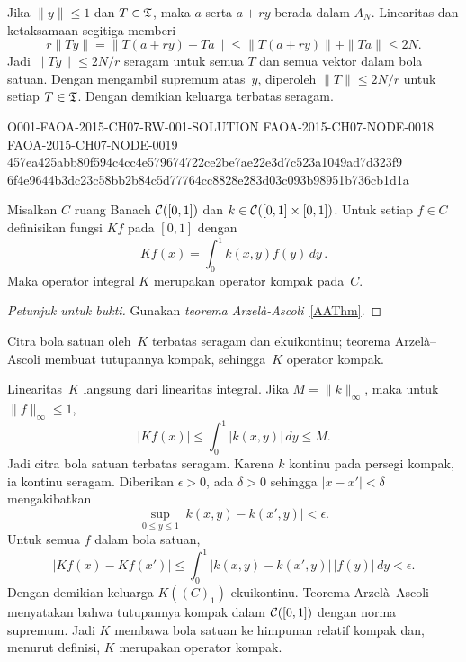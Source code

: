 \begin{o001readerwork}
\begin{o001proof}
Jika $\|y\|\leq1$ dan $T\in\mathfrak{T}$, maka $a$ serta $a+ry$ berada dalam
$A_N$. Linearitas dan ketaksamaan segitiga memberi
\[
 r\|Ty\|=\|T(a+ry)-Ta\|
 \leq\|T(a+ry)\|+\|Ta\|\leq2N.
\]
Jadi $\|Ty\|\leq2N/r$ seragam untuk semua $T$ dan semua vektor dalam bola
satuan. Dengan mengambil supremum atas~$y$, diperoleh
$\|T\|\leq2N/r$ untuk setiap $T\in\mathfrak{T}$. Dengan demikian keluarga
terbatas seragam.
\end{o001proof}
\end{o001readerwork}

\begin{o001readerwork}
  {O001-FAOA-2015-CH07-RW-001-SOLUTION}
  {FAOA-2015-CH07-NODE-0018}
  {FAOA-2015-CH07-NODE-0019}
  {457ea425abb80f594c4cc4e579674722ce2be7ae22e3d7c523a1049ad7d323f9}
  {6f4e9644b3dc23c58bb2b84c5d77764cc8828e283d03c093b98951b736cb1d1a}
\begin{o001result}
\begin{exam} Misalkan $C$ ruang Banach $\mathcal{C}([0,1])$ dan $k \in \mathcal{C}([0,1] \times [0,1])$.  Untuk setiap $f \in C$
definisikan fungsi $Kf$ pada $[0,1]$ dengan
   \[ Kf(x) = \int_0^1 k(x,y)f(y)\,dy\,. \]
Maka operator integral $K$ merupakan operator kompak pada~$C$.
\end{exam}
\end{o001result}
\begin{o001sourcehint}
\begin{proof}[\emph{Petunjuk untuk bukti}] Gunakan \emph{teorema Arzel\`a-Ascoli}~\ref{AAThm}.  \ns
\end{proof}
\end{o001sourcehint}
\begin{o001answer}
Citra bola satuan oleh~$K$ terbatas seragam dan ekuikontinu; teorema
Arzelà--Ascoli membuat tutupannya kompak, sehingga~$K$ operator kompak.
\end{o001answer}
\begin{o001proof}
Linearitas~$K$ langsung dari linearitas integral. Jika
$M=\|k\|_\infty$, maka untuk $\|f\|_\infty\leq1$,
\[
 |Kf(x)|\leq\int_0^1|k(x,y)|\,dy\leq M.
\]
Jadi citra bola satuan terbatas seragam. Karena $k$ kontinu pada persegi
kompak, ia kontinu seragam. Diberikan $\epsilon>0$, ada $\delta>0$ sehingga
$|x-x'|<\delta$ mengakibatkan
\[
 \sup_{0\leq y\leq1}|k(x,y)-k(x',y)|<\epsilon.
\]
Untuk semua $f$ dalam bola satuan,
\[
 |Kf(x)-Kf(x')|
 \leq\int_0^1|k(x,y)-k(x',y)|\,|f(y)|\,dy
 <\epsilon.
\]
Dengan demikian keluarga $K((C)_1)$ ekuikontinu. Teorema Arzelà--Ascoli
menyatakan bahwa tutupannya kompak dalam $\mathcal{C}([0,1])$ dengan norma
supremum. Jadi $K$ membawa bola satuan ke himpunan relatif kompak dan,
menurut definisi, $K$ merupakan operator kompak.
\end{o001proof}
\end{o001readerwork}

